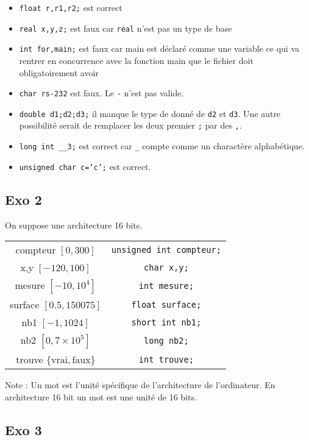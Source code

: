 \documentclass{article}
\begin{document}
\begin{itemize}
    \item \texttt{float r,r1,r2;} est correct
    \item \texttt{real x,y,z;} est faux car \texttt{real} n'est 
    pas un type de base
    \item \texttt{int for,main;} est faux car main est déclaré 
    comme une variable ce qui va rentrer en concurrence avec la 
    fonction main que le fichier doit obligatoirement avoir
    \item \texttt{char rs-232} est faux. Le \texttt{-} n'est pas 
    valide.
    \item \texttt{double d1;d2;d3;} il manque le type de donné de 
    \texttt{d2} et \texttt{d3}. Une autre possibilité serait de remplacer 
    les deux premier \texttt{;} par des \texttt{,}.
    \item \texttt{long int \_\_3;} est correct car \texttt{\_} compte 
    comme un charactère alphabétique.
    \item \texttt{unsigned char c='c';} est correct.
    
\end{itemize}

\subsection{Exo 2}

On suppose une architecture 16 bits.

\begin{tabular}{c|c}
    compteur $[0,300]$ & \texttt{unsigned int compteur;}\\
    x,y $[-120,100]$ & \texttt{char x,y;}\\
    mesure $[-10,10^4]$ & \texttt{int mesure;}\\
    surface $[0.5,150075]$ & \texttt{float surface;}\\
    nb1 $[-1,1024]$ & \texttt{short int nb1;}\\
    nb2 $[0,7\times 10^5]$ & \texttt{long nb2;}\\
    trouve $\{\text{vrai},\text{faux}\}$ & \texttt{int trouve;}\\

\end{tabular}

Note : Un mot est l'unité spécifique de l'architecture de 
l'ordinateur. En architecture 16 bit un mot est une unité de 
16 bits.

\subsection{Exo 3}
\end{document}
